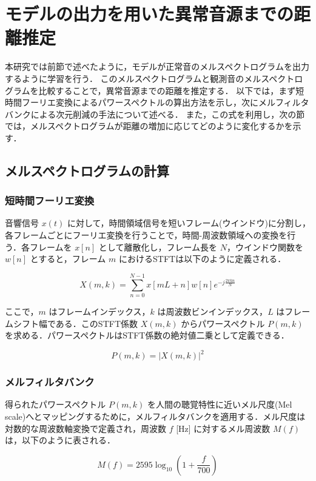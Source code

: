 \documentclass[../main]{subfiles}
\begin{document}
\section{モデルの出力を用いた異常音源までの距離推定}

\label{sec:pmethod_distance_estimation}

本研究では前節で述べたように，モデルが正常音のメルスペクトログラムを出力するように学習を行う．
このメルスペクトログラムと観測音のメルスペクトログラムを比較することで，異常音源までの距離を推定する．
以下では，まず短時間フーリエ変換によるパワースペクトルの算出方法を示し，次にメルフィルタバンクによる次元削減の手法について述べる．
また，この式を利用し，次の節では，メルスペクトログラムが距離の増加に応じてどのように変化するかを示す．

\subsection{メルスペクトログラムの計算}

\subsubsection{短時間フーリエ変換}

音響信号 $x(t)$ に対して，時間領域信号を短いフレーム(ウインドウ)に分割し，各フレームごとにフーリエ変換を行うことで，時間-周波数領域への変換を行う．各フレームを $x[n]$ として離散化し，フレーム長を $N$，ウインドウ関数を $w[n]$ とすると，フレーム $m$ におけるSTFTは以下のように定義される．

\[
X(m, k) = \sum_{n=0}^{N-1} x[mL + n] w[n] e^{-j \frac{2\pi k n}{N}}
\]

ここで，$m$ はフレームインデックス，$k$ は周波数ビンインデックス，$L$ はフレームシフト幅である．このSTFT係数 $X(m, k)$ からパワースペクトル $P(m, k)$ を求める．パワースペクトルはSTFT係数の絶対値二乗として定義できる．

\[
P(m, k) = |X(m, k)|^2
\]

\subsubsection{メルフィルタバンク}


得られたパワースペクトル $P(m, k)$ を人間の聴覚特性に近いメル尺度(Mel scale)へとマッピングするために，メルフィルタバンクを適用する．メル尺度は対数的な周波数軸変換で定義され，周波数 $f$ [Hz] に対するメル周波数 $M(f)$ は，以下のように表される．

\[
M(f) = 2595 \log_{10}\left(1 + \frac{f}{700}\right)
\]
\end{document}
